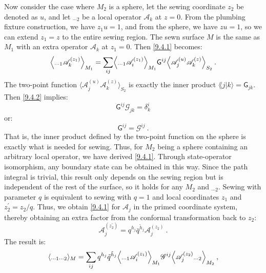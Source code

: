 Now consider the case where $M_{2}$ is a sphere, let the sewing coordinate $z_{2}$ be denoted as $u$, and let ${}_{\cdots 2}$ be a local operator $\mathscr{A}_{k}$ at $z=0$.
From the plumbing fixture construction, we have $z_{1} u=1$, and from the sphere, we have $z u=1$, so we can extend $z_{1}=z$ to the entire sewing region. 
The sewn surface $M$ is the same as $M_{1}$ with an extra operator $\mathscr{A}_{k}$ at $z_{1}=0$.
Then \eqref{9.4.1} becomes:
\begin{equation}
	\Bigl \langle {}_{\cdots 1} \mathscr{A}_{k}^{(z_{1})}\Bigr\rangle_{M_{1}} = 
	\sum_{i j}\Bigl\langle {}_{\cdots 1} \mathscr{A}_{i}^{(z_{1})}\Bigr\rangle_{M_{1}} \mathsf{G}^{ij} 
	\Bigl\langle\mathscr{A}_{j}^{(u)} \mathscr{A}_{k}^{(z)}\Bigr\rangle_{S_{2}} \:.
	\label{9.4.2}
\end{equation}
The two-point function $\langle\mathscr{A}_{j}^{(u)} \mathscr{A}_{k}^{(z)}\rangle_{S_{2}}$ is exactly the inner product $\lAngle j \vert k\rangle=\mathsf{G}_{jk}$. 
Then \eqref{9.4.2} implies:
\begin{equation}
	\mathsf{G}^{ij} \mathscr{G}_{jk} = \delta_{k}^{i} \label{9.4.3}
\end{equation}
or:
\begin{equation}
	\mathsf{G}^{ij} = \mathscr{G}^{ij} \:. \label{9.4.4}
\end{equation}
That is, the inner product defined by the two-point function on the sphere is exactly what is needed for sewing.
Thus, for $M_{2}$ being a sphere containing an arbitrary local operator, we have derived \eqref{9.4.1}. 
Through state-operator isomorphism, any boundary state can be obtained in this way. Since the path integral is trivial, this result only depends on the sewing region but is independent of the rest of the surface, 
so it holds for any $M_{2}$ and ${}_{\cdots 2}$.
Sewing with parameter $q$ is equivalent to sewing with $q=1$ and local coordinates $z_{1}$ and $z_{2}^{\prime}=z_{2} / q$. 
Thus, we obtain \eqref{9.4.1} for $\mathscr{A}_{j}$ in the primed coordinate system, thereby obtaining an extra factor from the conformal transformation back to $z_{2}$:
\begin{equation}
	\mathscr{A}_{j}^{(z_{2}^{\prime})}=q^{h_{j}} \bar{q}^{\tilde{h}_{j}} \mathscr{A}_{j}^{(z_{2})} \:.
	\label{9.4.5}
\end{equation}
The result is:
\begin{equation}
	\langle {}_{\cdots 1 \cdots 2} \rangle_{M} = \sum_{ij} q^{h_{j}} \tilde{q}^{\tilde{h}_{j}} 
	\Bigl\langle {}_{\cdots 1} \mathscr{A}_{i}^{(z_{1})}\Bigr\rangle_{M_{1}} \mathscr{G}^{i j} 
	\Bigl\langle\mathscr{A}_{j}^{(z_{2})} {}_{\cdots 2} \Bigr\rangle_{M_{2}} \:, \label{9.4.6}
\end{equation}
